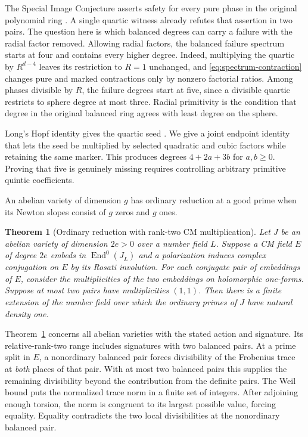 \documentclass[11pt]{article}
\newtheorem{theorem}{Theorem}
\DeclareMathOperator{\End}{End}
\begin{document}
The Special Image Conjecture asserts safety for every pure phase in the
original polynomial ring \cite[Conjecture~3.1]{image}. A single quartic
witness already refutes that assertion in two pairs. The question here is
which balanced degrees can carry a failure with the radial factor
removed. Allowing radial factors, the balanced failure spectrum starts
at four and contains every higher degree. Indeed, multiplying the quartic by
\(R^{d-4}\) leaves its restriction to \(R=1\) unchanged, and
\eqref{eq:spectrum-contraction} changes pure and marked contractions only
by nonzero factorial ratios. Among phases divisible by \(R\), the failure
degrees start at five, since a divisible quartic restricts to sphere
degree at most three. Radial primitivity is the condition that degree in the
original balanced ring agrees with least degree on the sphere.

Long's Hopf identity gives the quartic seed \cite{longcompact}. We give a
joint endpoint identity that lets the seed be multiplied by selected
quadratic and cubic factors while retaining the same marker. This
produces degrees \(4+2a+3b\) for \(a,b\geq0\). Proving that five is genuinely
missing requires controlling arbitrary primitive quintic coefficients.

An abelian variety of dimension \(g\) has ordinary reduction at a good
prime when its Newton slopes consist of \(g\) zeros and \(g\) ones.

\begin{theorem}[Ordinary reduction with rank-two CM multiplication]\label{lem:rank-two}
Let \(J\) be an abelian variety of dimension \(2e>0\) over a number field \(L\).
Suppose a CM field \(E\) of degree \(2e\) embeds in
\(\End^0(J_{\overline L})\) and a polarization induces complex conjugation
on \(E\) by its Rosati involution. For each conjugate pair of embeddings of
\(E\), consider the multiplicities of the two embeddings on holomorphic
one-forms. Suppose at most two pairs have multiplicities \((1,1)\). Then
there is a finite extension of the number field over which the ordinary
primes of \(J\) have natural density one.
\end{theorem}

Theorem~\ref{lem:rank-two} concerns all abelian varieties with the stated
action and signature. Its relative-rank-two range includes signatures with
two balanced pairs. At a prime split in \(E\), a nonordinary balanced
pair forces divisibility of the Frobenius trace at \emph{both} places of
that pair. With at most two balanced pairs this supplies the remaining
divisibility beyond the contribution from the definite pairs. The Weil
bound puts the normalized trace norm in a finite set of integers. After
adjoining enough torsion, the norm is congruent to its largest possible
value, forcing equality. Equality contradicts the two local divisibilities
at the nonordinary balanced pair.
\end{document}

